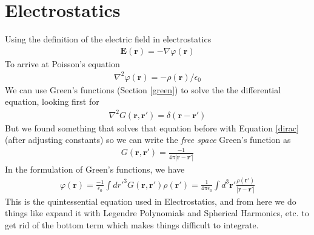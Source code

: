 \section{Electrostatics}
Using the definition of the electric field in electrostatics
\begin{align}
\textbf{E}(\textbf{r}) = -\nabla \varphi(\textbf{r})
\end{align}
To arrive at Poisson's equation
\begin{align}
\nabla^2\varphi(\textbf{r}) = -\rho(\textbf{r})/\epsilon_0
\end{align}
We can use Green's functions (Section \ref{green}) to solve the the differential equation, looking first for 
\begin{align}
\nabla^2 G(\textbf{r},\textbf{r}') = \delta(\textbf{r}-\textbf{r}')
\end{align}
But we found something that solves that equation before with Equation \ref{dirac} (after adjusting constants) so we can write the \emph{free space} Green's function as
\begin{align}
G(\textbf{r},\textbf{r}') = \frac{-1}{4\pi|\textbf{r}-\textbf{r}'|}
\end{align}
In the formulation of Green's functions, we have
\begin{align}\label{potential}
\varphi(\textbf{r}) = \frac{-1}{\epsilon_0}\int dr'^3  G(\textbf{r},\textbf{r}') \rho(\textbf{r}') = \frac{1}{4\pi\epsilon_0}\int d^3\textbf{r}' \frac{\rho(\textbf{r}')}{|\textbf{r}-\textbf{r}'|}
\end{align}
This is the quintessential equation used in Electrostatics, and from here we do things like expand it with Legendre Polynomials and Spherical Harmonics, etc. to get rid of the bottom term which makes things difficult to integrate.

